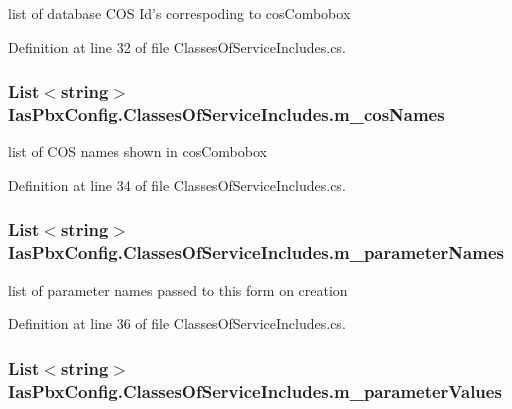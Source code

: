 list of database COS Id's correspoding to cosCombobox 

Definition at line 32 of file ClassesOfServiceIncludes.cs.\hypertarget{class_ias_pbx_config_1_1_classes_of_service_includes_a3b65b51c4adc787d70721576ed36f517}{
\subsubsection[{m\_\-cosNames}]{\setlength{\rightskip}{0pt plus 5cm}List$<$string$>$ {\bf IasPbxConfig.ClassesOfServiceIncludes.m\_\-cosNames}}}
\label{class_ias_pbx_config_1_1_classes_of_service_includes_a3b65b51c4adc787d70721576ed36f517}


list of COS names shown in cosCombobox 

Definition at line 34 of file ClassesOfServiceIncludes.cs.\hypertarget{class_ias_pbx_config_1_1_classes_of_service_includes_a49839fa27002d5efe394c25bea712e5d}{
\subsubsection[{m\_\-parameterNames}]{\setlength{\rightskip}{0pt plus 5cm}List$<$string$>$ {\bf IasPbxConfig.ClassesOfServiceIncludes.m\_\-parameterNames}}}
\label{class_ias_pbx_config_1_1_classes_of_service_includes_a49839fa27002d5efe394c25bea712e5d}


list of parameter names passed to this form on creation 

Definition at line 36 of file ClassesOfServiceIncludes.cs.\hypertarget{class_ias_pbx_config_1_1_classes_of_service_includes_a797acd582bd34a112372aa3b957b4ddc}{
\subsubsection[{m\_\-parameterValues}]{\setlength{\rightskip}{0pt plus 5cm}List$<$string$>$ {\bf IasPbxConfig.ClassesOfServiceIncludes.m\_\-parameterValues}}}
\label{class_ias_pbx_config_1_1_classes_of_service_includes_a797acd582bd34a112372aa3b957b4ddc}


